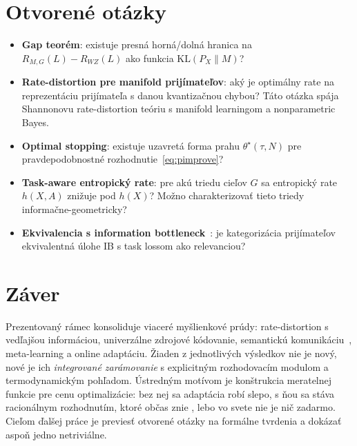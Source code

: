 \documentclass[11pt,a4paper]{article}
\begin{document}
\section{Otvorené otázky}

\begin{itemize}
    \item \textbf{Gap teorém}: existuje presná horná/dolná hranica
          na $R_{M,G}(L) - R_{WZ}(L)$ ako funkcia $\text{KL}(P_X\|M)$?
    \item \textbf{Rate-distortion pre manifold prijímateľov}: aký je
          optimálny rate na reprezentáciu prijímateľa s danou
          kvantizačnou chybou? Táto otázka spája Shannonovu rate-distortion
          teóriu s manifold learningom a nonparametric Bayes.
    \item \textbf{Optimal stopping}: existuje uzavretá forma prahu
          $\theta^\star(\tau, N)$ pre pravdepodobnostné rozhodnutie~\eqref{eq:pimprove}?
    \item \textbf{Task-aware entropický rate}: pre akú triedu cieľov
          $G$ sa entropický rate $h(X,A)$ znižuje pod $h(X)$? Možno
          charakterizovať tieto triedy informačne-geometricky?
    \item \textbf{Ekvivalencia s information bottleneck}~\cite{tishby1999}:
          je kategorizácia prijímateľov ekvivalentná úlohe IB s task
          lossom ako relevanciou?
\end{itemize}

\section{Záver}

Prezentovaný rámec konsoliduje viaceré myšlienkové prúdy:
rate-distortion s vedľajšou informáciou, univerzálne zdrojové
kódovanie, semantickú komunikáciu~\cite{popovski2022}, meta-learning
a online adaptáciu. Žiaden z jednotlivých výsledkov nie je nový, nové
je ich \emph{integrované zarámovanie} s explicitným rozhodovacím
modulom a termodynamickým pohľadom. Ústredným motívom je konštrukcia
meratelnej funkcie pre cenu optimalizácie: bez nej sa adaptácia robí
slepo, s ňou sa stáva racionálnym rozhodnutím, ktoré občas znie
, lebo vo svete nie je nič zadarmo. Cieľom ďalšej práce
je previesť otvorené otázky na formálne tvrdenia a dokázať aspoň jedno
netriviálne.
\end{document}
